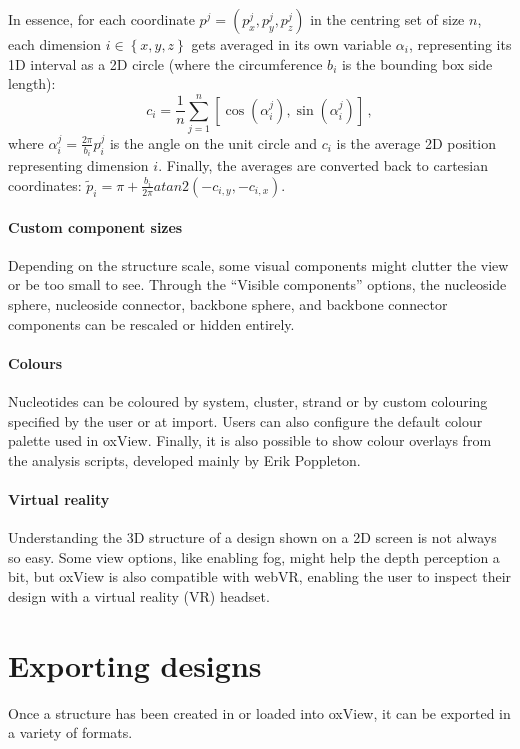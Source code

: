 In essence, for each coordinate \(p^j = \left(p_x^j, p_y^j, p_z^j\right) \) in the centring set of size \(n\), each dimension \(i \in \left\{x,y,z\right\}\) gets averaged in its own variable \(\alpha_i\), representing its 1D interval as a 2D circle (where the circumference \(b_i\) is the bounding box side length):
\[
  c_i = \frac{1}{n} \sum_{j = 1}^{n} \left[ \cos \left( \alpha_i^j \right), \sin \left( \alpha_i^j \right) \right]\,,
\]
where \(\alpha_i^j = \frac{2 \pi}{b_i} p_i^j\) is the angle on the unit circle and \(c_i\) is the average 2D position representing dimension \(i\). Finally, the averages are converted back to cartesian coordinates: 
\(
  \widetilde{p}_i = \pi + \frac{b_i}{2\pi} atan2(-c_{i,y}, -c_{i, x})
\).

\paragraph{Custom component sizes} Depending on the structure scale, some visual components might clutter the view or be too small to see. Through the ``Visible components'' options, the nucleoside sphere, nucleoside connector, backbone sphere, and backbone connector components can be rescaled or hidden entirely.

\paragraph{Colours} Nucleotides can be coloured by system, cluster, strand or by custom colouring specified by the user or at import. Users can also configure the default colour palette used in oxView. Finally, it is also possible to show colour overlays from the analysis scripts, developed mainly by Erik Poppleton. 

\paragraph{Virtual reality} Understanding the 3D structure of a design shown on a 2D screen is not always so easy. Some view options, like enabling fog, might help the depth perception a bit, but oxView is also compatible with webVR, enabling the user to inspect their design with a virtual reality (VR) headset. 

\section{Exporting designs}
\label{sec:oxdna_export}
Once a structure has been created in or loaded into oxView, it can be exported in a variety of formats.

